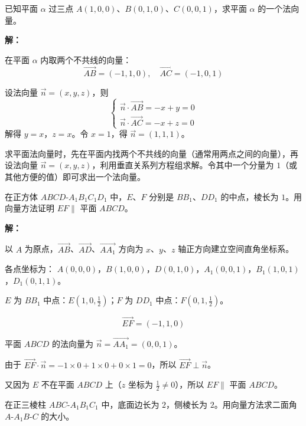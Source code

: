 \documentclass[12pt, a4paper]{ctexart}
\begin{document}
\begin{examplebox}[【例题3】求平面的法向量]
已知平面 $\alpha$ 过三点 $A(1,0,0)$、$B(0,1,0)$、$C(0,0,1)$，求平面 $\alpha$ 的一个法向量。
\end{examplebox}

\textbf{解：}

在平面 $\alpha$ 内取两个不共线的向量：
\[
\overrightarrow{AB}=(-1,1,0),\quad\overrightarrow{AC}=(-1,0,1)
\]

设法向量 $\vec{n}=(x,y,z)$，则
\[
\begin{cases}\vec{n}\cdot\overrightarrow{AB}=-x+y=0\\\vec{n}\cdot\overrightarrow{AC}=-x+z=0\end{cases}
\]
解得 $y=x$，$z=x$。令 $x=1$，得 $\vec{n}=(1,1,1)$。

\begin{tipbox}[方法总结]
求平面法向量时，先在平面内找两个不共线的向量（通常用两点之间的向量），再设法向量 $\vec{n}=(x,y,z)$，利用垂直关系列方程组求解。令其中一个分量为 $1$（或其他方便的值）即可求出一个法向量。
\end{tipbox}

\begin{examplebox}[【例题4】证明线面平行]
在正方体 $ABCD$-$A_1B_1C_1D_1$ 中，$E$、$F$ 分别是 $BB_1$、$DD_1$ 的中点，棱长为 $1$。用向量方法证明 $EF\parallel$ 平面 $ABCD$。
\end{examplebox}

\textbf{解：}

以 $A$ 为原点，$\overrightarrow{AB}$、$\overrightarrow{AD}$、$\overrightarrow{AA_1}$ 方向为 $x$、$y$、$z$ 轴正方向建立空间直角坐标系。

各点坐标为：
$A(0,0,0)$，$B(1,0,0)$，$D(0,1,0)$，$A_1(0,0,1)$，$B_1(1,0,1)$，$D_1(0,1,1)$。

$E$ 为 $BB_1$ 中点：$E(1,0,\tfrac{1}{2})$；$F$ 为 $DD_1$ 中点：$F(0,1,\tfrac{1}{2})$。

\[
\overrightarrow{EF}=(-1,1,0)
\]

平面 $ABCD$ 的法向量为 $\vec{n}=\overrightarrow{AA_1}=(0,0,1)$。

由于 $\overrightarrow{EF}\cdot\vec{n}=-1\times0+1\times0+0\times1=0$，所以 $\overrightarrow{EF}\perp\vec{n}$。

又因为 $E$ 不在平面 $ABCD$ 上（$z$ 坐标为 $\tfrac{1}{2}\ne0$），所以 $EF\parallel$ 平面 $ABCD$。

\begin{examplebox}[【例题5】求二面角]
在正三棱柱 $ABC$-$A_1B_1C_1$ 中，底面边长为 $2$，侧棱长为 $2$。用向量方法求二面角 $A$-$A_1B$-$C$ 的大小。
\end{examplebox}
\end{document}
